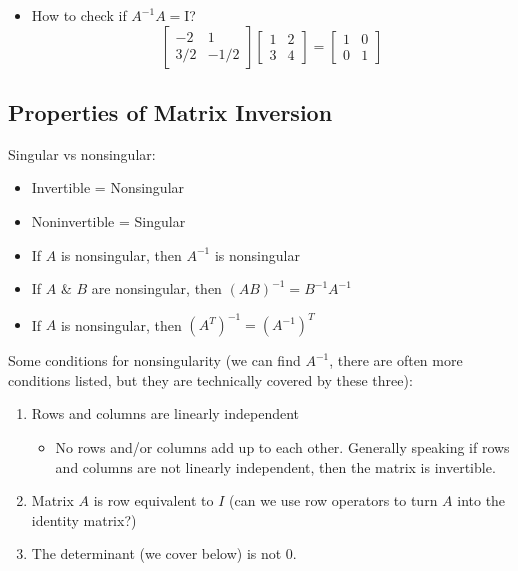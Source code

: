\begin{itemize}
    \item How to check if $A^{-1}A = \text{I}$?
    \begin{equation*}
        \begin{bmatrix}
            -2 & 1 \\
            3/2 & -1/2
        \end{bmatrix}
        \begin{bmatrix}
            1 & 2 \\
            3 & 4
        \end{bmatrix}
        = 
        \begin{bmatrix}
            1 & 0 \\
            0 & 1
        \end{bmatrix}
    \end{equation*}
\end{itemize}

\subsection{Properties of Matrix Inversion}

Singular vs nonsingular:

\begin{itemize}
    \item Invertible = Nonsingular
    \item Noninvertible = Singular
    \item If $A$ is nonsingular, then $A^{-1}$ is nonsingular
    \item If $A$ \& $B$ are nonsingular, then $(AB)^{-1} = B^{-1}A^{-1}$
    \item If $A$ is nonsingular, then $(A^T)^{-1} = (A^{-1})^T$
\end{itemize}

\noindent Some conditions for nonsingularity (we can find $A^{-1}$, there are often more conditions listed, but they are technically covered by these three):

\begin{enumerate}
    \item Rows and columns are linearly independent
    \begin{itemize}
        \item No rows and/or columns add up to each other. Generally speaking if rows and columns are not linearly independent, then the matrix is invertible.
    \end{itemize}
    \item Matrix $A$ is row equivalent to $I$ (can we use row operators to turn $A$ into the identity matrix?)
    \item The determinant (we cover below) is not 0.
\end{enumerate}

